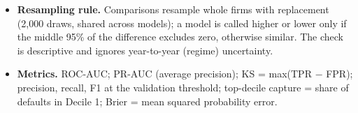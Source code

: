 \documentclass[9pt,letterpaper]{extarticle}
\begin{document}
{\begin{itemize}
  \item \textbf{Resampling rule.} Comparisons resample whole firms with replacement (2,000 draws, shared across models); a model is called higher or lower only if the middle 95\% of the difference excludes zero, otherwise similar. The check is descriptive and ignores year-to-year (regime) uncertainty.
  \item \textbf{Metrics.} ROC-AUC; PR-AUC (average precision); KS = max(TPR $-$ FPR); precision, recall, F1 at the validation threshold; top-decile capture = share of defaults in Decile 1; Brier = mean squared probability error.
\end{itemize}
}

\clearpage
\end{document}
